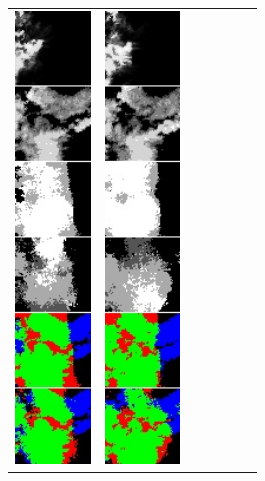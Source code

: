 \begin{figure}[h]
\begin{tabular}{lllllll}
\includegraphics[width=20mm]{abb/prediction/102_cat_maxCont}&
\includegraphics[width=20mm]{abb/prediction/103_cat_maxCont}&

\end{tabular}
\end{figure}
